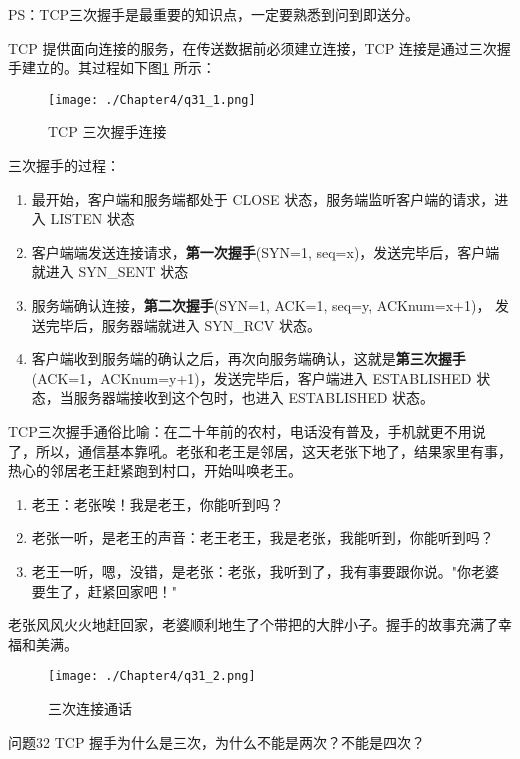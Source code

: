 \documentclass[cn,11pt,color=blue,lang=cn]{elegantbook}
\begin{document}
\begin{solution}
PS：TCP三次握手是最重要的知识点，一定要熟悉到问到即送分。

TCP 提供面向连接的服务，在传送数据前必须建立连接，TCP 连接是通过三次握手建立的。其过程如下图\ref{fig31_1} 所示：
\begin{figure}[htbp]
\centering
\texttt{[image: ./Chapter4/q31\_1.png]}
\caption{TCP 三次握手连接}
\label{fig31_1}
\end{figure}

三次握手的过程：
\begin{enumerate}
	\item 最开始，客户端和服务端都处于 CLOSE 状态，服务端监听客户端的请求，进入 LISTEN 状态
	\item 客户端端发送连接请求，\textbf{第一次握手}(SYN=1, seq=x)，发送完毕后，客户端就进入 SYN\_SENT 状态
	\item 服务端确认连接，\textbf{第二次握手}(SYN=1, ACK=1, seq=y, ACKnum=x+1)， 发送完毕后，服务器端就进入 SYN\_RCV 状态。
	\item 客户端收到服务端的确认之后，再次向服务端确认，这就是\textbf{第三次握手} (ACK=1，ACKnum=y+1)，发送完毕后，客户端进入 ESTABLISHED 状态，当服务器端接收到这个包时，也进入 ESTABLISHED 状态。
\end{enumerate}

TCP三次握手通俗比喻：在二十年前的农村，电话没有普及，手机就更不用说了，所以，通信基本靠吼。老张和老王是邻居，这天老张下地了，结果家里有事，热心的邻居老王赶紧跑到村口，开始叫唤老王。

\begin{enumerate}
	\item 老王：老张唉！我是老王，你能听到吗？
	\item 老张一听，是老王的声音：老王老王，我是老张，我能听到，你能听到吗？
	\item 老王一听，嗯，没错，是老张：老张，我听到了，我有事要跟你说。"你老婆要生了，赶紧回家吧！"
\end{enumerate}  

老张风风火火地赶回家，老婆顺利地生了个带把的大胖小子。握手的故事充满了幸福和美满。
\begin{figure}[htbp]
\centering
\texttt{[image: ./Chapter4/q31\_2.png]}
\caption{三次连接通话}
\label{fig31_2}
\end{figure}
\end{solution}

\begin{custom}{问题32}
TCP 握手为什么是三次，为什么不能是两次？不能是四次？
\end{custom}
\end{document}
